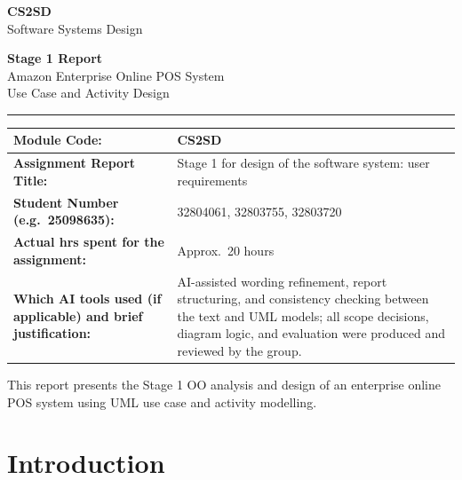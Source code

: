 \documentclass[11pt,a4paper]{article}
\renewcommand{\arraystretch}{1.08}
\begin{document}
\begin{titlepage}
\thispagestyle{empty}
\centering
\vspace*{1.8cm}
{\Large\color{coverblue}\textbf{CS2SD}}\\[0.25em]
{\large Software Systems Design}

\vspace{1.2cm}
{\Huge\textbf{Stage 1 Report}}\\[0.45em]
{\Large Amazon Enterprise Online POS System}\\[0.2em]
{\large Use Case and Activity Design}

\vspace{0.9cm}
\color{coverline}\rule{0.82\textwidth}{1.2pt}
\color{black}

\vspace{0.9cm}
\renewcommand{\arraystretch}{1.16}
\setlength{\tabcolsep}{7pt}
\begin{table}[h]
\centering
\normalsize
\begin{tabularx}{\textwidth}{|>{\raggedright\arraybackslash}p{5.2cm}|X|}
\hline
\textbf{Module Code:} & CS2SD \\ \hline
\textbf{Assignment Report Title:} & Stage 1 for design of the software system: user requirements \\ \hline
\textbf{Student Number (e.g.\ 25098635):} & 32804061, 32803755, 32803720 \\ \hline
\textbf{Actual hrs spent for the assignment:} & Approx.\ 20 hours \\ \hline
\textbf{Which AI tools used (if applicable) and brief justification:} & AI-assisted wording refinement, report structuring, and consistency checking between the text and UML models; all scope decisions, diagram logic, and evaluation were produced and reviewed by the group. \\ \hline
\end{tabularx}
\end{table}
\vfill
{\small This report presents the Stage 1 OO analysis and design of an enterprise online POS system using UML use case and activity modelling.}
\end{titlepage}

\setcounter{page}{1}

\section{Introduction}
\end{document}
